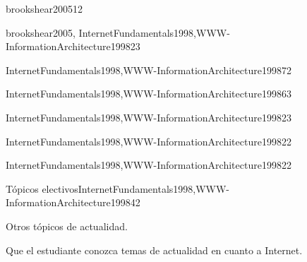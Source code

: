 \begin{syllabus}
\begin{unit}{\IMInformationManagementConcepts}{}{brookshear2005}{1}{2}
   \IMInformationManagementConceptsAllTopics
   \IMInformationManagementConceptsAllLearningOutcomes
\end{unit}

\begin{unit}{\SEToolsandEnvironments}{}{brookshear2005, InternetFundamentals1998,WWW-InformationArchitecture1998}{2}{3}
   \SEToolsandEnvironmentsAllTopics
   \SEToolsandEnvironmentsAllLearningOutcomes
\end{unit}

\begin{unit}{\PBDWebPlatforms}{}{InternetFundamentals1998,WWW-InformationArchitecture1998}{7}{2}
   \PBDWebPlatformsAllTopics
   \PBDWebPlatformsAllLearningOutcomes
\end{unit}

\begin{unit}{\NCNetworkedApplications}{}{InternetFundamentals1998,WWW-InformationArchitecture1998}{6}{3}
   \NCNetworkedApplicationsAllTopics
   \NCNetworkedApplicationsAllLearningOutcomes
\end{unit}

\begin{unit}{\PLObjectOrientedProgramming}{}{InternetFundamentals1998,WWW-InformationArchitecture1998}{2}{3}
   \PLObjectOrientedProgrammingAllTopics
   \PLObjectOrientedProgrammingAllLearningOutcome
\end{unit}

\begin{unit}{\IMMultimediaSystems}{}{InternetFundamentals1998,WWW-InformationArchitecture1998}{2}{2}
   \IMMultimediaSystemsAllTopics
   \IMMultimediaSystemsAllLearningOutcomes
\end{unit}

\begin{unit}{\SESoftwareProjectManagement}{}{InternetFundamentals1998,WWW-InformationArchitecture1998}{2}{2}
   \SESoftwareProjectManagementAllTopics
   \SESoftwareProjectManagementAllLearningOutcomes
\end{unit}

\begin{unit}{Tópicos electivos}{}{InternetFundamentals1998,WWW-InformationArchitecture1998}{4}{2}
\begin{topics}
      \item Otros tópicos de actualidad.
   \end{topics}
   \begin{learningoutcomes}
      \item Que el estudiante conozca temas de actualidad en cuanto a Internet.
   \end{learningoutcomes}
\end{unit}

\begin{coursebibliography}
\end{coursebibliography}

\end{syllabus}

%


